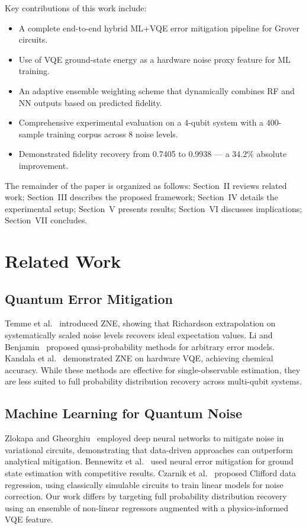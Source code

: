 \documentclass[journal]{IEEEtran}
\begin{document}
Key contributions of this work include:
\begin{itemize}
  \item A complete end-to-end hybrid ML+VQE error mitigation pipeline for Grover circuits.
  \item Use of VQE ground-state energy as a hardware noise proxy feature for ML training.
  \item An adaptive ensemble weighting scheme that dynamically combines RF and NN outputs based on predicted fidelity.
  \item Comprehensive experimental evaluation on a 4-qubit system with a 400-sample training corpus across 8 noise levels.
  \item Demonstrated fidelity recovery from 0.7405 to 0.9938 --- a 34.2\% absolute improvement.
\end{itemize}

The remainder of the paper is organized as follows: Section~II reviews related work; Section~III describes the proposed framework; Section~IV details the experimental setup; Section~V presents results; Section~VI discusses implications; Section~VII concludes.

\section{Related Work}

\subsection{Quantum Error Mitigation}

Temme et al.~\cite{temme2017} introduced ZNE, showing that Richardson extrapolation on systematically scaled noise levels recovers ideal expectation values. Li and Benjamin~\cite{li2017} proposed quasi-probability methods for arbitrary error models. Kandala et al.~\cite{kandala2019} demonstrated ZNE on hardware VQE, achieving chemical accuracy. While these methods are effective for single-observable estimation, they are less suited to full probability distribution recovery across multi-qubit systems.

\subsection{Machine Learning for Quantum Noise}

Zlokapa and Gheorghiu~\cite{zlokapa2020} employed deep neural networks to mitigate noise in variational circuits, demonstrating that data-driven approaches can outperform analytical mitigation. Bennewitz et al.~\cite{bennewitz2022} used neural error mitigation for ground state estimation with competitive results. Czarnik et al.~\cite{czarnik2021} proposed Clifford data regression, using classically simulable circuits to train linear models for noise correction. Our work differs by targeting full probability distribution recovery using an ensemble of non-linear regressors augmented with a physics-informed VQE feature.
\end{document}
